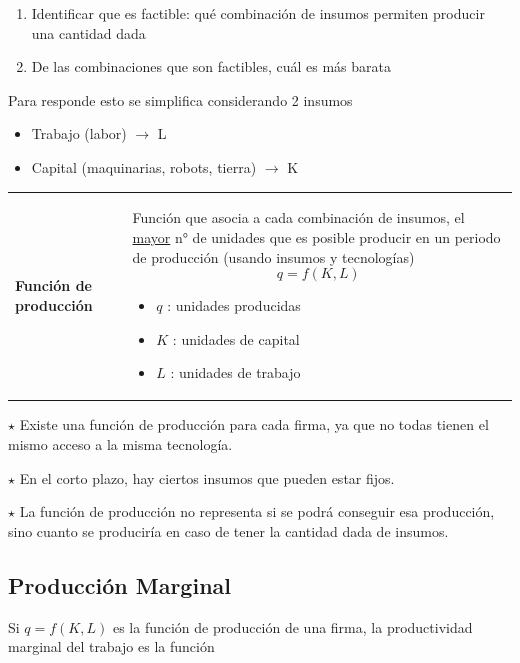 \documentclass{report}
\newenvironment{obs}{$\star$ }{}
\newenvironment{definition}[1]{\begin{center}
\begin{tabular}{p{3.5cm} p{12.5cm}}
\textbf{#1} &
}
{\\ \end{tabular}\end{center}}
\begin{document}
\begin{enumerate}
\item Identificar que es factible: qué combinación de insumos permiten producir una cantidad dada
\item De las combinaciones que son factibles, cuál es más barata
\end{enumerate}

Para responde esto se simplifica considerando 2 insumos
\begin{itemize}
    \item Trabajo (labor) $\longrightarrow$ L
    \item Capital (maquinarias, robots, tierra) $\longrightarrow$ K
\end{itemize}

\begin{definition}{Función de producción}
    Función que asocia a cada combinación de insumos, el \underline{mayor} n° de unidades que es posible producir en un periodo de producción (usando insumos y tecnologías)
    \[
    q = f\!\left( K, L \right) 
    \] 
    \begin{itemize}
        \item $q$ : unidades producidas
            \item $K$ : unidades de capital
                \item $L$ : unidades de trabajo
    \end{itemize}
\end{definition}

\begin{obs}
    Existe una función de producción para cada firma, ya que no todas tienen el mismo acceso a la misma tecnología.
\end{obs}

\begin{obs}
    En el corto plazo, hay ciertos insumos que pueden estar fijos.
\end{obs}

\begin{obs}
    La función de producción no representa si se podrá conseguir esa producción, sino cuanto se produciría en caso de tener la cantidad dada de insumos.
\end{obs}

\subsection{Producción Marginal}

Si $q=f\!\left( K,L \right) $ es la función de producción de una firma, la productividad marginal del trabajo es la función
\end{document}
